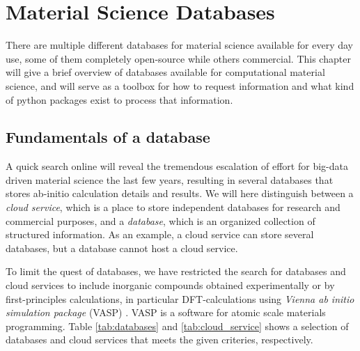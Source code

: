 \chapter{Material Science Databases}

There are multiple different databases for material science available for every day use, some of them completely open-source while others commercial. This chapter will give a brief overview of databases available for computational material science, and will serve as a toolbox for how to request information and what kind of python packages exist to process that information.





\section{Fundamentals of a database}

A quick search online will reveal the tremendous escalation of effort for big-data driven material science the last few years, resulting in several databases that stores ab-initio calculation details and results. We will here distinguish between a \textit{cloud service}, which is a place to store independent databases for research and commercial purposes, and a \textit{database}, which is an organized collection of structured information. As an example, a cloud service can store several databases, but a database cannot host a cloud service.

To limit the quest of databases, we have restricted the search for databases and cloud services to include inorganic compounds obtained experimentally or by first-principles calculations, in particular DFT-calculations using \textit{Vienna ab initio simulation package} (VASP) \cite{Kresse1996}. VASP is a software for atomic scale materials programming. Table \ref{tab:databases} and \ref{tab:cloud_service} shows a selection of databases and cloud services that meets the given criteries, respectively.

